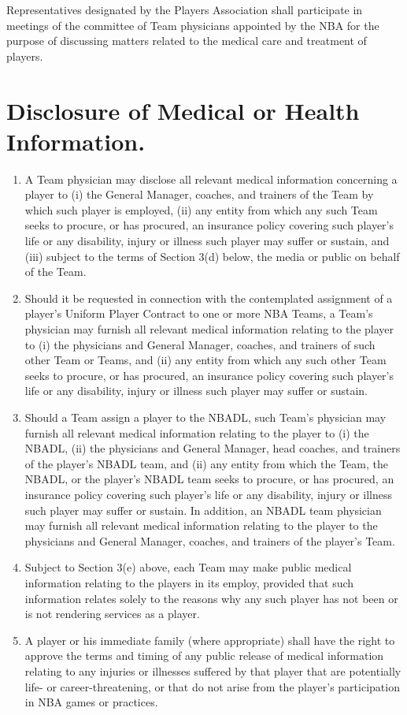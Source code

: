\documentclass[
]{book}
\providecommand{\tightlist}{%
  \setlength{\itemsep}{0pt}\setlength{\parskip}{0pt}}
\begin{document}
Representatives designated by the Players Association shall participate in meetings of the committee of Team physicians appointed by the NBA for the purpose of discussing matters related to the medical care and treatment of players.

\hypertarget{disclosure-of-medical-or-health-information.}{%
\section{Disclosure of Medical or Health Information.}\label{disclosure-of-medical-or-health-information.}}

\begin{enumerate}
\def\labelenumi{(\alph{enumi})}
\tightlist
\item
  A Team physician may disclose all relevant medical information concerning a player to (i) the General Manager, coaches, and trainers of the Team by which such player is employed, (ii) any entity from which any such Team seeks to procure, or has procured, an insurance policy covering such player's life or any disability, injury or illness such player may suffer or sustain, and (iii) subject to the terms of Section 3(d) below, the media or public on behalf of the Team.
\item
  Should it be requested in connection with the contemplated assignment of a player's Uniform Player Contract to one or more NBA Teams, a Team's physician may furnish all relevant medical information relating to the player to (i) the physicians and General Manager, coaches, and trainers of such other Team or Teams, and (ii) any entity from which any such other Team seeks to procure, or has procured, an insurance policy covering such player's life or any disability, injury or illness such player may suffer or sustain.
\item
  Should a Team assign a player to the NBADL, such Team's physician may furnish all relevant medical information relating to the player to (i) the NBADL, (ii) the physicians and General Manager, head coaches, and trainers of the player's NBADL team, and (ii) any entity from which the Team, the NBADL, or the player's NBADL team seeks to procure, or has procured, an insurance policy covering such player's life or any disability, injury or illness such player may suffer or sustain. In addition, an NBADL team physician may furnish all relevant medical information relating to the player to the physicians and General Manager, coaches, and trainers of the player's Team.
\item
  Subject to Section 3(e) above, each Team may make public medical information relating to the players in its employ, provided that such information relates solely to the reasons why any such player has not been or is not rendering services as a player.
\item
  A player or his immediate family (where appropriate) shall have the right to approve the terms and timing of any public release of medical information relating to any injuries or illnesses suffered by that player that are potentially life- or career-threatening, or that do not arise from the player's participation in NBA games or practices.
\end{enumerate}
\end{document}
